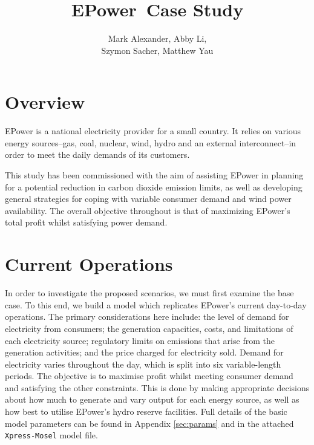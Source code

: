 \documentclass[twocolumn]{article}
\title{\Huge EPower\ Case Study}
\author{Mark Alexander, Abby Li,\\[0.2cm]Szymon Sacher, Matthew Yau}
\begin{document}
	\begin{titlepage}
	\clearpage
	\maketitle
    \thispagestyle{empty}

    \end{titlepage}
    
    
    \section{Overview}
    
    EPower is a national electricity provider for a small country.  It relies on various energy sources--gas, coal, nuclear, wind, hydro and an external interconnect--in order to meet the daily demands of its customers.
    
    This study has been commissioned with the aim of assisting EPower in planning for a potential reduction in carbon dioxide emission limits, as well as developing general strategies for coping with variable consumer demand and wind power availability.  The overall objective throughout is that of maximizing EPower's total profit whilst satisfying power demand.
    
    
    
    \section{Current Operations}
	
    In order to investigate the proposed scenarios, we must first examine the base case.  To this end, we build a model which replicates EPower's current day-to-day operations. The primary considerations here include: the level of demand for electricity from consumers; the generation capacities, costs, and limitations of each electricity source; regulatory limits on emissions that arise from the generation activities; and the price charged for electricity sold.  Demand for electricity varies throughout the day, which is split into six variable-length periods.  The objective is to maximise profit whilst meeting consumer demand and satisfying the other constraints.  This is done by making appropriate decisions about how much to generate and vary output for each energy source, as well as how best to utilise EPower's hydro reserve facilities. Full details of the basic model parameters can be found in Appendix \ref{sec:params} and in the attached \texttt{Xpress-Mosel} model file.
    
\end{document}
